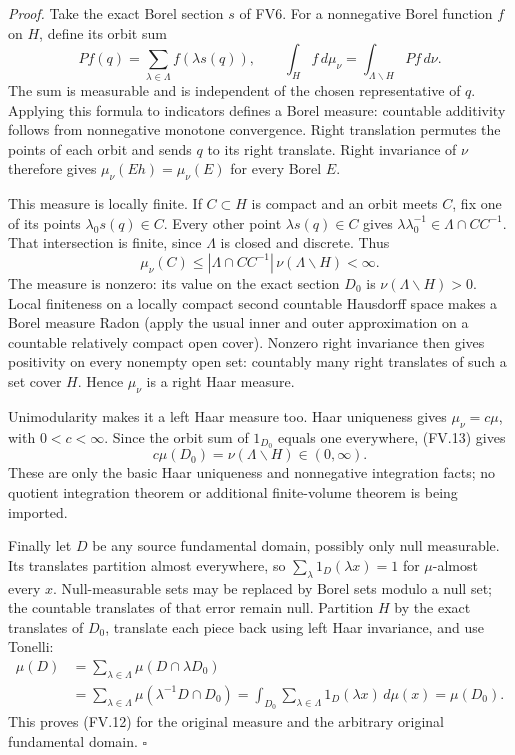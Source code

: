 \emph{Proof.}
Take the exact Borel section \(s\) of FV6.  For a nonnegative Borel
function \(f\) on \(H\), define its orbit sum
\[
 P f(q)=\sum_{\lambda\in\Lambda}f(\lambda s(q)),\qquad
              \int_H f\,d\mu_\nu=\int_{\Lambda\backslash H}Pf\,d\nu.
 \tag{FV.13}
\]
The sum is measurable and is independent of the chosen representative
of \(q\).  Applying this formula to indicators defines a Borel
measure: countable additivity follows from nonnegative monotone
convergence.  Right translation permutes the points of each orbit
and sends \(q\) to its right translate.  Right invariance of \(\nu\)
therefore gives \(\mu_\nu(Eh)=\mu_\nu(E)\) for every Borel \(E\).

This measure is locally finite.  If \(C\subset H\) is compact and an
orbit meets \(C\), fix one of its points \(\lambda_0s(q)\in C\).
Every other point \(\lambda s(q)\in C\) gives
\(\lambda\lambda_0^{-1}\in\Lambda\cap CC^{-1}\).  That intersection
is finite, since \(\Lambda\) is closed and discrete.  Thus
\[
 \mu_\nu(C)\le
       |\Lambda\cap CC^{-1}|\,\nu(\Lambda\backslash H)<\infty.
 \tag{FV.14}
\]
The measure is nonzero: its value on the exact section \(D_0\) is
\(\nu(\Lambda\backslash H)>0\).  Local finiteness on a locally compact
second countable Hausdorff space makes a Borel measure Radon
(apply the usual inner and outer approximation on a countable
relatively compact open cover).  Nonzero right invariance then
gives positivity on every nonempty open set: countably many right
translates of such a set cover \(H\).  Hence \(\mu_\nu\) is a right
Haar measure.

Unimodularity makes it a left Haar measure too.  Haar uniqueness
gives \(\mu_\nu=c\mu\), with \(0<c<\infty\).  Since the orbit
sum of \(1_{D_0}\) equals one everywhere, (FV.13) gives
\[
          c\mu(D_0)=\nu(\Lambda\backslash H)\in(0,\infty).
 \tag{FV.15}
\]
These are only the basic Haar uniqueness and nonnegative integration
facts; no quotient integration theorem or additional finite-volume
theorem is being imported.

Finally let \(D\) be any source fundamental domain, possibly only
null measurable.  Its translates partition almost everywhere, so
\(\sum_{\lambda}1_D(\lambda x)=1\) for \(\mu\)-almost every \(x\).
Null-measurable sets may be replaced by Borel sets modulo a null
set; the countable translates of that error remain null.
Partition \(H\) by the exact translates of \(D_0\), translate each
piece back using left Haar invariance, and use Tonelli:
\[
 \begin{aligned}
 \mu(D)
  &=\sum_{\lambda\in\Lambda}\mu(D\cap\lambda D_0)\\
  &=\sum_{\lambda\in\Lambda}
       \mu(\lambda^{-1}D\cap D_0)
    =\int_{D_0}\sum_{\lambda\in\Lambda}1_D(\lambda x)\,d\mu(x)
    =\mu(D_0).
 \end{aligned}
 \tag{FV.16}
\]
This proves (FV.12) for the original measure and the arbitrary
original fundamental domain. \(\square\)

